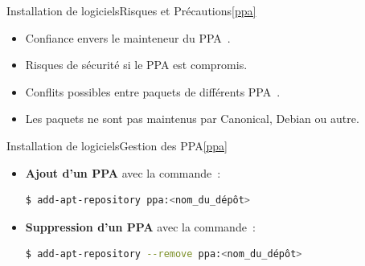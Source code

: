 \documentclass{beamer}
\begin{document}
    \begin{frame}{Installation de logiciels}{Risques et Précautions\cref{ppa}}
        \begin{dangercolorbox}
            \begin{itemize}
                \item Confiance envers le mainteneur du PPA~.
                \item Risques de sécurité si le PPA est compromis.
                \item Conflits possibles entre paquets de différents PPA~.
                \item Les paquets ne sont pas maintenus par Canonical, Debian ou autre.
            \end{itemize}
        \end{dangercolorbox}
    \end{frame}

    \begin{frame}[fragile]{Installation de logiciels}{Gestion des PPA\cref{ppa}}
        \begin{itemize}
            \item \textbf{Ajout d'un PPA} avec la commande~:
            \begin{lstlisting}[language=bash]
$ add-apt-repository ppa:<nom_du_dépôt>
            \end{lstlisting}
            \item \textbf{Suppression d'un PPA} avec la commande~:
            \begin{lstlisting}[language=bash]
$ add-apt-repository --remove ppa:<nom_du_dépôt>
            \end{lstlisting}
        \end{itemize}
    \end{frame}
\end{document}
